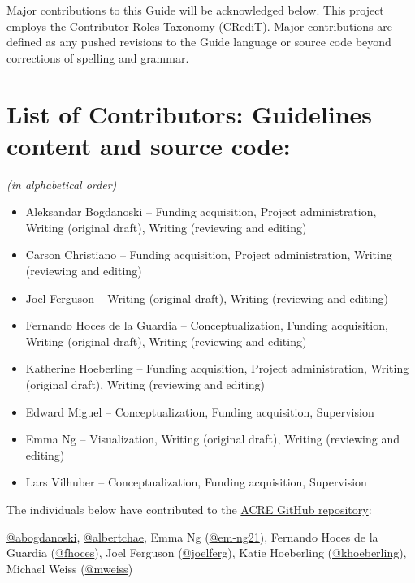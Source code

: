 \documentclass[
]{book}
\providecommand{\tightlist}{%
  \setlength{\itemsep}{0pt}\setlength{\parskip}{0pt}}
\begin{document}
Major contributions to this Guide will be acknowledged below. This project employs the Contributor Roles Taxonomy (\href{https://casrai.org/credit/}{CRediT}). Major contributions are defined as any pushed revisions to the Guide language or source code beyond corrections of spelling and grammar.

\hypertarget{list-of-contributors-guidelines-content-and-source-code}{%
\section{List of Contributors: Guidelines content and source code:}\label{list-of-contributors-guidelines-content-and-source-code}}

\emph{(in alphabetical order)}

\begin{itemize}
\tightlist
\item
  Aleksandar Bogdanoski -- Funding acquisition, Project administration, Writing (original draft), Writing (reviewing and editing)
\item
  Carson Christiano -- Funding acquisition, Project administration, Writing (reviewing and editing)
\item
  Joel Ferguson -- Writing (original draft), Writing (reviewing and editing)
\item
  Fernando Hoces de la Guardia -- Conceptualization, Funding acquisition, Writing (original draft), Writing (reviewing and editing)
\item
  Katherine Hoeberling -- Funding acquisition, Project administration, Writing (original draft), Writing (reviewing and editing)
\item
  Edward Miguel -- Conceptualization, Funding acquisition, Supervision
\item
  Emma Ng -- Visualization, Writing (original draft), Writing (reviewing and editing)
\item
  Lars Vilhuber -- Conceptualization, Funding acquisition, Supervision
\end{itemize}

The individuals below have contributed to the \href{https://github.com/BITSS/ACRE}{ACRE GitHub repository}:

\href{https://github.com/abogdanoski}{@abogdanoski}, \href{https://github.com/albertchae}{@albertchae}, Emma Ng (\href{https://github.com/em-ng21}{@em-ng21}), Fernando Hoces de la Guardia (\href{https://github.com/fhoces}{@fhoces}), Joel Ferguson (\href{https://github.com/joelferg}{@joelferg}), Katie Hoeberling (\href{https://github.com/khoeberling}{@khoeberling}), Michael Weiss (\href{https://github.com/mweiss}{@mweiss})
\end{document}
